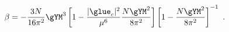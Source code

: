 \begin{equation}
\label{beta_new}
 \beta  = -\frac{3N}{16\pi^2} \gYM^3 
  \left[1- \frac{|\glue_c|^2}{\mu^6} \frac{N\gYM^2}{8\pi^2} \right]
  \left[1-\frac{N\gYM^2}{8\pi^2} \right]^{-1}~.
\end{equation}

